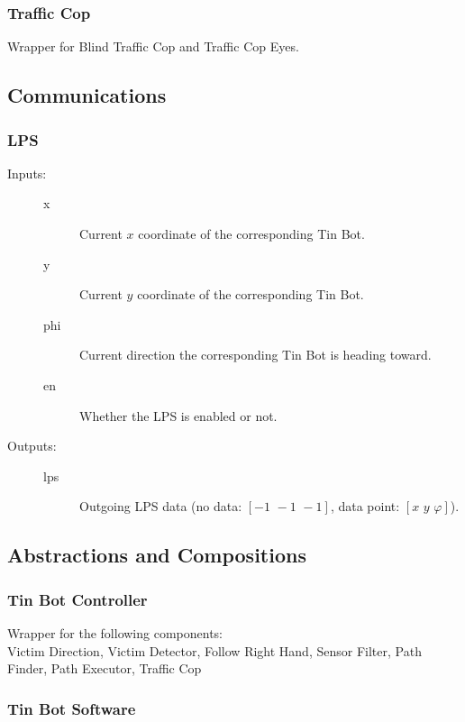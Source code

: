 \documentclass[a4paper,parskip,headheight=38pt]{scrartcl} %
\begin{document}
\subsubsection{Traffic Cop}

Wrapper for Blind Traffic Cop and Traffic Cop Eyes.

\subsection{Communications}

\subsubsection{LPS}
\begin{description}
\item[Inputs:] \hfill
	\begin{description}
	\item[x] Current $x$ coordinate of the corresponding Tin Bot.
	\item[y] Current $y$ coordinate of the corresponding Tin Bot.
	\item[phi] Current direction the corresponding Tin Bot is heading toward.
	\item[en] Whether the LPS is enabled or not.
	\end{description}
\item[Outputs:] \hfill
	\begin{description}
	\item[lps] Outgoing LPS data  (no data: $[-1\,\, -1\,\, -1]$, data point: $[x\,\, y\,\, \varphi]$).
	\end{description}
\end{description}



\subsection{Abstractions and Compositions}
\subsubsection{Tin Bot Controller}

Wrapper for the following components: \\
Victim Direction, Victim Detector, Follow Right Hand, Sensor Filter, Path Finder, Path Executor, Traffic Cop

\subsubsection{Tin Bot Software}
\end{document}
